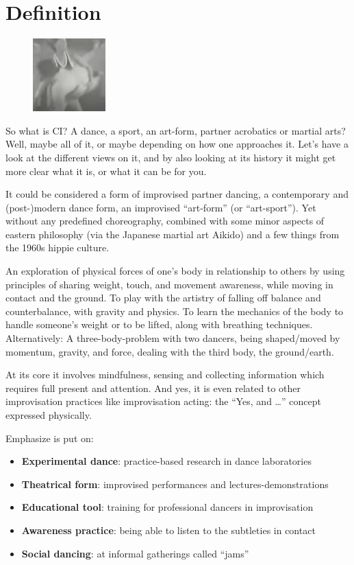 \section{Definition}\label{sec:definition}

\begin{figure}
\centering
\includegraphics[width=0.25\textwidth]{images/definition}
\end{figure}

So what is CI? A dance, a sport, an art-form, partner acrobatics or martial arts?
Well, maybe all of it, or maybe depending on how one approaches it.
Let's have a look at the different views on it, and by also looking at its history it might get more clear what it is, or what it can be for you.

It could be considered a form of improvised partner dancing, a contemporary and (post-)modern dance form, an improvised ``art-form'' (or ``art-sport'').
Yet without any predefined choreography, combined with some minor aspects of eastern philosophy (via the Japanese martial art Aikido) and a few things from the 1960s hippie culture.

An exploration of physical forces of one's body in relationship to others by using principles of sharing weight, touch, and movement awareness, while moving in contact and the ground.
To play with the artistry of falling off balance and counterbalance, with gravity and physics.
To learn the mechanics of the body to handle someone's weight or to be lifted, along with breathing techniques.
Alternatively: A three-body-problem with two dancers, being shaped/moved by momentum, gravity, and force, dealing with the third body, the ground/earth.

At its core it involves mindfulness, sensing and collecting information which requires full present and attention.
And yes, it is even related to other improvisation practices like improvisation acting: the ``Yes, and \ldots'' concept expressed physically.

Emphasize is put on:
\begin{itemize}
	\item \textbf{Experimental dance}: practice-based research in dance laboratories
	\item \textbf{Theatrical form}: improvised performances and lectures-demonstrations
	\item \textbf{Educational tool}: training for professional dancers in improvisation
	\item \textbf{Awareness practice}: being able to listen to the subtleties in contact
	\item \textbf{Social dancing}: at informal gatherings called ``jams''
\end{itemize}

